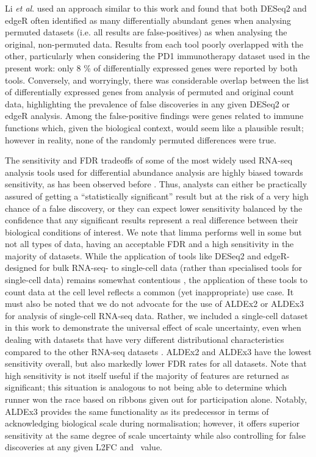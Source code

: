 \documentclass[10pt,letterpaper]{article}
\begin{document}
Li \textit{et al}. \cite{li_exaggerated_2022} used an approach similar to this work and found that both DESeq2 and edgeR often identified as many differentially abundant genes when analysing permuted datasets (i.e. all results are false-positives) as when analysing the original, non-permuted data. Results from each tool poorly overlapped with the other, particularly when considering the PD1 immunotherapy dataset used in the present work: only 8 \% of differentially expressed genes were reported by both tools. Conversely, and worryingly, there was considerable overlap between the list of differentially expressed genes from analysis of permuted and original count data, highlighting the prevalence of false discoveries in any given DESeq2 or edgeR analysis. Among the false-positive findings were genes related to immune functions which, given the biological context, would seem like a plausible result; however in reality, none of the randomly permuted differences were true.

The sensitivity and FDR tradeoffs of some of the most widely used RNA-seq analysis tools used for differential abundance analysis  are highly biased towards sensitivity, as has been observed before \cite{hawinkel2017, weiss_normalization_2017, Nearing:2022aa, li_exaggerated_2022}. Thus, analysts can either be practically assured of getting a ``statistically significant'' result but at the risk of a very high chance of a false discovery, or they can expect lower sensitivity balanced by the confidence that any significant results represent a real difference between their biological conditions of interest. We note that limma performs well in some but not all types of data, having an acceptable FDR and a high sensitivity in the majority of datasets. While the application of tools like DESeq2 and edgeR- designed for bulk RNA-seq- to single-cell data (rather than specialised tools for single-cell data) remains somewhat contentious \cite{murphy_balanced_2022}, the application of these tools to count data at the cell level reflects a common (yet inappropriate) use case. It must also be noted that we do not advocate for the use of ALDEx2 or ALDEx3 for analysis of single-cell RNA-seq data. Rather, we included a single-cell dataset in this work to demonstrate the universal effect of scale uncertainty, even when dealing with datasets that have very different distributional characteristics compared to the other RNA-seq datasets . ALDEx2 and ALDEx3 have the lowest sensitivity overall, but also markedly lower FDR rates for all datasets. Note that high sensitivity is not itself useful if the majority of features are returned as significant; this situation is analogous to not being able to determine which runner won the race based on ribbons given out for participation alone. Notably, ALDEx3 provides the same functionality as its predecessor in terms of acknowledging biological scale during normalisation; however, it offers superior sensitivity at the same degree of scale uncertainty while also controlling for false discoveries at any given L2FC and \textgamma~value.
\end{document}
